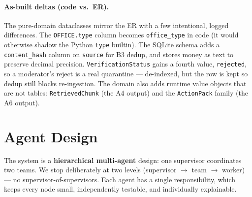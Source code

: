 \documentclass[11pt,a4paper]{article}
\begin{document}
\paragraph{As-built deltas (code vs.\ ER).} The pure-domain dataclasses mirror the ER with a few
intentional, logged differences. The \texttt{OFFICE.type} column becomes \texttt{office\_type} in
code (it would otherwise shadow the Python \texttt{type} builtin). The SQLite schema adds a
\texttt{content\_hash} column on \texttt{source} for B3 dedup, and stores money as text to preserve
decimal precision. \texttt{VerificationStatus} gains a fourth value, \texttt{rejected}, so a
moderator's reject is a real quarantine --- de-indexed, but the row is kept so dedup still blocks
re-ingestion. The domain also adds runtime value objects that are not tables: \texttt{RetrievedChunk}
(the A4 output) and the \texttt{ActionPack} family (the A6 output).

\section{Agent Design}
\label{sec:agents}

The system is a \textbf{hierarchical multi-agent} design: one supervisor coordinates two teams. We
stop deliberately at two levels (supervisor $\to$ team $\to$ worker) --- no supervisor-of-supervisors.
Each agent has a single responsibility, which keeps every node small, independently testable, and
individually explainable.
\end{document}
